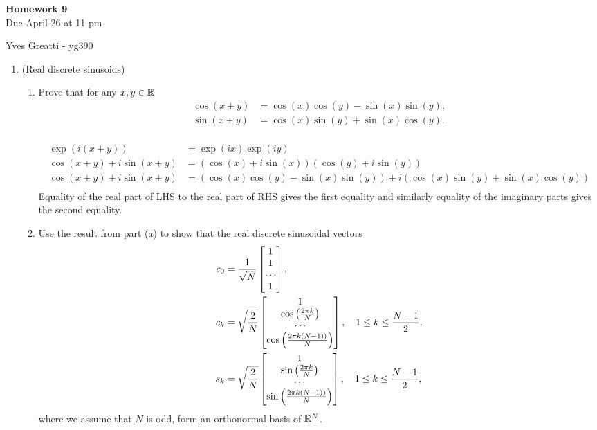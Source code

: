 \documentclass[12pt,twoside]{article}
\begin{document}
\begin{center}
{\large{\textbf{Homework 9}} } \vspace{0.2cm}\\
Due April 26 at 11 pm
\end{center}
Yves Greatti - yg390\\


\begin{enumerate}

\item (Real discrete sinusoids)

 \begin{enumerate}
 \item Prove that for any $x,y\in\mathbb{R}$
  \begin{align}
 \cos(x+y) & = \cos(x)\cos(y) - \sin(x)\sin(y) ,\\
 \sin(x+y) & = \cos(x)\sin(y) + \sin(x)\cos(y) .
 \end{align}\\
 
 \begin{align*}
	  \exp(i (x+y)) 					&= \exp(ix) \exp(iy) \\
 	 \cos(x+y) + i \sin(x+y)			&= (\cos(x) + i \sin(x))(\cos(y) + i \sin(y)) \\
	  \cos(x+y) + i \sin(x+y)			&= (\cos(x) \cos(y) -  \sin(x) \sin(y)) + i (\cos(x) \sin(y) +  \sin(x) \cos(y)) \\
 \end{align*}
Equality of the real part of LHS to the real part of RHS gives the first equality and similarly equality of  the imaginary parts gives the second equality.
 
 \item Use the result from part (a) to show that the real discrete sinusoidal vectors
 \begin{align}
 c_0 & = \frac{1}{\sqrt{N}}\begin{bmatrix} 1 \\ 1 \\ \cdots \\ 1 \end{bmatrix},\\
c_k & = \sqrt{\frac{2}{N}}\begin{bmatrix} 1 \\ \cos \left( \frac{2 \pi k }{N} \right) \\ \cdots \\ \cos \left( \frac{2 \pi k (N-1))}{N} \right) \end{bmatrix}, \quad 1 \leq k \leq \frac{N-1}{2},\\
 s_k & = \sqrt{\frac{2}{N}}\begin{bmatrix} 1 \\ \sin \left( \frac{2 \pi k }{N} \right) \\ \cdots \\ \sin \left( \frac{2 \pi k (N-1))}{N} \right) \end{bmatrix}, \quad 1 \leq k \leq \frac{N-1}{2},
 \end{align}
 where we assume that $N$ is odd, form an orthonormal basis of $\mathbb{R}^{N}$.
 

\end{enumerate}
\end{enumerate}
\end{document}
